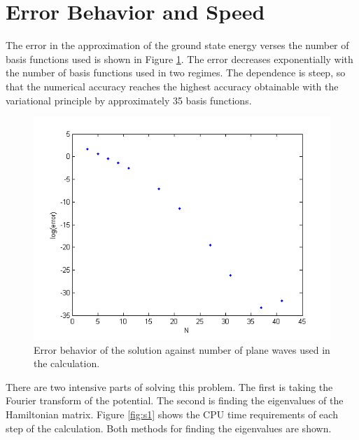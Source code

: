 \documentclass[12pt, a4paper, twocolumn]{article}
\begin{document}
\section{Error Behavior and Speed}
\label{sec:cpu}

The error in the approximation of the ground state energy verses the number of basis functions used is shown in Figure \ref{fig:a4}. The error decreases exponentially with the number of basis functions used in two regimes. The dependence is steep, so that the numerical accuracy reaches the highest accuracy obtainable with the variational principle by approximately 35 basis functions.

\begin{figure}[h!]
  \centering
    \includegraphics[scale=0.5]{a4.png}
	\caption{Error behavior of the solution against number of plane waves used in the calculation.}
	\label{fig:a4}
\end{figure}

There are two intensive parts of solving this problem. The first is taking the Fourier transform of the potential. The second is finding the eigenvalues of the Hamiltonian matrix. Figure \ref{fig:s1} shows the CPU time requirements of each step of the calculation. Both methods for finding the eigenvalues are shown.
\end{document}
